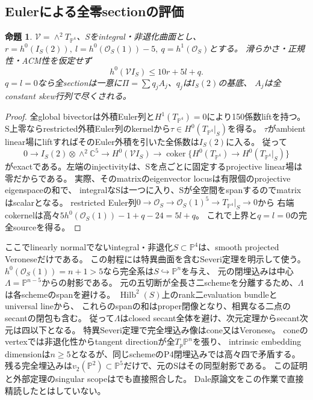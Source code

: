 \documentclass[a4paper,11pt]{ltjsarticle}
\newtheorem{proposition}{命題}[section]
\theoremstyle{definition}
\begin{document}
\subsection{Eulerによる全零sectionの評価}
\begin{proposition}\label{prop:surface-Euler-bound}
$\mathcal V=\wedge^2T_{\mathbb P^4}$、Sをintegral・非退化曲面とし、
$r=h^0(I_S(2)),\ l=h^0(\mathcal O_S(1))-5,\ q=h^1(\mathcal O_S)$とする。
滑らかさ・正規性・ACM性を仮定せず
\[
 h^0(\mathcal V I_S)\le10r+5l+q.
\]
$q=l=0$なら全sectionは一意に$\Pi=\sum q_jA_j$、$q_j$は$I_S(2)$の基底、
$A_j$は全constant skew行列で尽くされる。
\end{proposition}
\begin{proof}
全global bivectorは外積Euler列と$H^1(T_{\mathbb P^4})=0$により150係数liftを持つ。
S上零ならrestricted外積Euler列のkernelから$\tau\in H^0(T_{\mathbb P^4}|_S)$を得る。
$\tau$がambient linear場にliftすればそのEuler外積を引いた全係数は$I_S(2)$に入る。
従って
\[
 0\to I_S(2)\otimes\wedge^2\mathbb C^5\to H^0(\mathcal V I_S)
 \to\operatorname{coker}\{H^0(T_{\mathbb P^4})\to H^0(T_{\mathbb P^4}|_S)\}
\]
がexactである。左端のinjectivityは、Sを点ごとに固定するprojective linear場は零だからである。
実際、そのmatrixのeigenvector locusは有限個のprojective eigenspaceの和で、
integralなSは一つに入り、Sが全空間をspanするのでmatrixはscalarとなる。
restricted Euler列$0\to\mathcal O_S\to\mathcal O_S(1)^5\to T_{\mathbb P^4}|_S\to0$から
右端cokernelは高々$5h^0(\mathcal O_S(1))-1+q-24=5l+q$。
これで上界と$q=l=0$の完全sourceを得る。
\end{proof}

ここでlinearly normalでないintegral・非退化$S\subset\mathbb P^4$は、smooth projected Veroneseだけである。
この射程には特異曲面を含むSeveri定理\cite[Theorem 14, pp.369--370]{chiantini}を明示して使う。
$h^0(\mathcal O_S(1))=n+1>5$なら完全系は$S\hookrightarrow\mathbb P^n$を与え、
元の閉埋込みは中心$\Lambda=\mathbb P^{n-5}$からの射影である。
元の五切断が全長さ二schemeを分離するため、$\Lambda$は各schemeのspanを避ける。
$\operatorname{Hilb}^2(S)$上のrank二evaluation bundleとuniversal lineから、
これらのspanの和はproper閉像となり、相異なる二点のsecantの閉包も含む。
従って$\Lambda$はclosed secant全体を避け、次元定理からsecant次元は四以下となる。
特異Severi定理で完全埋込み像はcone又はVeronese。
coneのvertexでは非退化性からtangent directionが全$T_p\mathbb P^n$を張り、
intrinsic embedding dimensionは$n\ge5$となるが、同じschemeのP4閉埋込みでは高々四で矛盾する。
残る完全埋込みは$v_2(\mathbb P^2)\subset\mathbb P^5$だけで、元のSはその同型射影である。
この証明と外部定理のsingular scopeは\cite[Proposition 5.3の証明, pp.15--16]{niupark}でも直接照合した。
Dale原論文をこの作業で直接精読したとはしていない。
\end{document}
